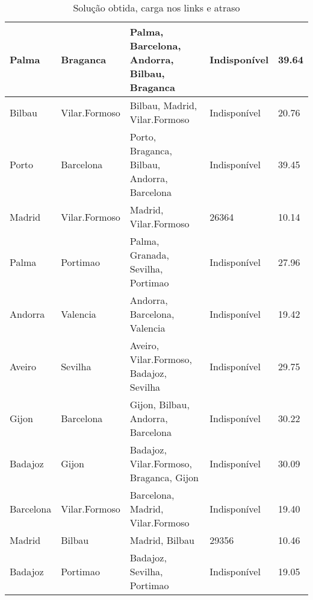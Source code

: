 \begin{table}[!htb]
{\begin{tabular}{|l|l|l|l|l|}
Palma & Braganca & Palma, Barcelona, Andorra, Bilbau, Braganca & Indisponível & 39.64 \\ \hline
Bilbau & Vilar.Formoso & Bilbau, Madrid, Vilar.Formoso & Indisponível & 20.76 \\ \hline
Porto & Barcelona & Porto, Braganca, Bilbau, Andorra, Barcelona & Indisponível & 39.45 \\ \hline
Madrid & Vilar.Formoso & Madrid, Vilar.Formoso & 26364 & 10.14 \\ \hline
Palma & Portimao & Palma, Granada, Sevilha, Portimao & Indisponível & 27.96 \\ \hline
Andorra & Valencia & Andorra, Barcelona, Valencia & Indisponível & 19.42 \\ \hline
Aveiro & Sevilha & Aveiro, Vilar.Formoso, Badajoz, Sevilha & Indisponível & 29.75 \\ \hline
Gijon & Barcelona & Gijon, Bilbau, Andorra, Barcelona & Indisponível & 30.22 \\ \hline
Badajoz & Gijon & Badajoz, Vilar.Formoso, Braganca, Gijon & Indisponível & 30.09 \\ \hline
Barcelona & Vilar.Formoso & Barcelona, Madrid, Vilar.Formoso & Indisponível & 19.40 \\ \hline
Madrid & Bilbau & Madrid, Bilbau & 29356 & 10.46 \\ \hline
Badajoz & Portimao & Badajoz, Sevilha, Portimao & Indisponível & 19.05 \\ \hline
\end{tabular}}
\caption[]{Solução obtida, carga nos links e atraso}
\end{table}

